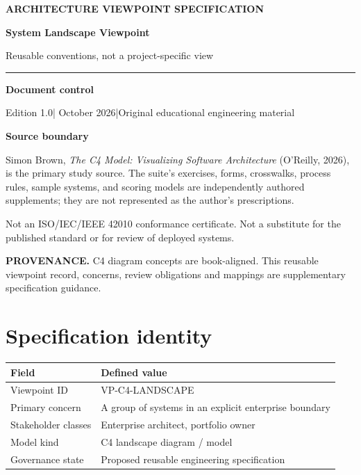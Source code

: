 \documentclass[10pt,letterpaper]{article}
\newcommand{\SourceNote}[1]{\par\smallskip\noindent\colorbox{C4Light}{\parbox{0.94\linewidth}{\footnotesize\textbf{PROVENANCE.} #1}}\par\medskip}
\newcommand{\DocStart}[3]{%
\begin{document}
\begin{titlepage}
\renewcommand{\thepage}{title-\arabic{page}}
\vspace*{0.55in}
{\sffamily\bfseries\small\color{C4Teal}#1}\par\vspace{0.24in}
{\sffamily\bfseries\fontsize{26}{31}\selectfont\color{C4Navy}#2}\par\vspace{0.18in}
{\large\color{C4Gray}#3}\par\vspace{0.4in}
\textcolor{C4Teal}{\rule{\linewidth}{1.15pt}}\par\vspace{0.24in}
\textbf{Document control}\par
Edition 1.0\quad|\quad 30 October 2026\quad|\quad Original educational engineering material\par
\vspace{0.17in}
\textbf{Source boundary}\par
Simon Brown, \emph{The C4 Model: Visualizing Software Architecture} (O'Reilly, 2026), is the primary study source. The suite's exercises, forms, crosswalks, process rules, sample systems, and scoring models are independently authored supplements; they are not represented as the author's prescriptions.\par
\vfill
{\small\color{C4Gray}Not an ISO/IEC/IEEE 42010 conformance certificate. Not a substitute for the published standard or for review of deployed systems.}\par
\end{titlepage}
}
\DocStart{ARCHITECTURE VIEWPOINT SPECIFICATION}{System Landscape Viewpoint}{Reusable conventions, not a project-specific view}
\SourceNote{C4 diagram concepts are book-aligned. This reusable viewpoint record, concerns, review obligations and mappings are supplementary specification guidance.}
\section{Specification identity}
\begin{tabularx}{\linewidth}{@{}YY@{}}\toprule
\textbf{Field} & \textbf{Defined value} \\ \midrule
Viewpoint ID & VP-C4-LANDSCAPE \\
Primary concern & A group of systems in an explicit enterprise boundary \\
Stakeholder classes & Enterprise architect, portfolio owner \\
Model kind & C4 landscape diagram / model \\
Governance state & Proposed reusable engineering specification \\
\bottomrule\end{tabularx}
\end{document}
